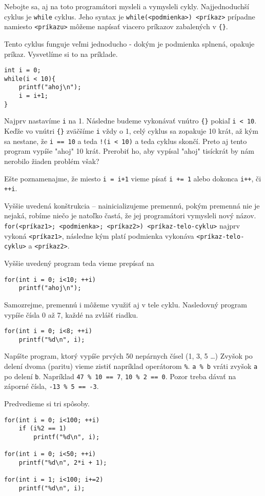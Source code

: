 Nebojte sa, aj na toto programátori mysleli a vymysleli cykly.  Najjednoduchší
cyklus je \verb!while! cyklus. Jeho syntax je 
\verb!while(<podmienka>) <príkaz>! prípadne namiesto \verb!<príkazu>! 
môžeme napísať viacero príkazov zabalených v \verb!{}!.

Tento cyklus funguje veľmi jednoducho - dokým je podmienka splnená, opakuje
príkaz. Vysvetlíme si to na príklade.
\begin{lstlisting}
int i = 0;
while(i < 10){
    printf("ahoj\n");
    i = i+1;
}
\end{lstlisting}
Najprv nastavíme \verb!i! na 1. Následne budeme vykonávať vnútro \verb!{}! pokiaľ 
\verb!i < 10!. Keďže vo vnútri \verb!{}! zväčšíme \verb!i! vždy o 1, celý cyklus sa zopakuje
10 krát, až kým sa nestane, že \verb!i == 10! a teda \verb'!(i < 10)' a teda cyklus
skončí.  Preto aj tento program vypíše "ahoj" 10 krát. Prerobiť ho, aby vypísal
"ahoj" tisíckrát by nám nerobilo žiaden problém však?

Ešte poznamenajme, že miesto \verb!i = i+1! vieme písať \verb!i += 1! alebo
dokonca \verb!i++!, či \verb!++i!.

\medskip

Vyššie uvedená konštrukcia -- nainicializujeme premennú, pokým premenná nie je
nejaká, robíme niečo je natoľko častá, že jej programátori vymysleli nový
názov. \verb!for(<príkaz1>; <podmienka>; <príkaz2>) <príkaz-telo-cyklu>! najprv
vykoná \verb!<príkaz1>!, následne kým platí podmienka vykonáva
\verb!<príkaz-telo-cyklu>! a \verb!<príkaz2>!.

Vyššie uvedený program teda vieme prepísať na
\begin{lstlisting}
for(int i = 0; i<10; ++i)
    printf("ahoj\n");
\end{lstlisting}

Samozrejme, premennú i môžeme využiť aj v tele cyklu. Nasledovný program vypíše
čísla 0 až 7, každé na zvlášť riadku.
\begin{lstlisting}
for(int i = 0; i<8; ++i)
    printf("%d\n", i);
\end{lstlisting}

\cvicenie Napíšte program, ktorý vypíše prvých 50 nepárnych čísel (1, 3,
5 \dots) Zvyšok po delení dvoma (paritu) vieme zistiť napríklad operátorom \verb!%!.
\verb!a % b! vráti zvyšok \verb!a! po delení \verb!b!. Napríklad \verb!47 % 10 == 7!, \verb!10 % 2 == 0!.
Pozor treba dávať na záporné čísla, \verb!-13 % 5 == -3!.

\riesenie Predvedieme si tri spôsoby. 
\begin{lstlisting}
for(int i = 0; i<100; ++i)
    if (i%2 == 1)
        printf("%d\n", i);

for(int i = 0; i<50; ++i)
    printf("%d\n", 2*i + 1);

for(int i = 1; i<100; i+=2)
    printf("%d\n", i);
\end{lstlisting}

